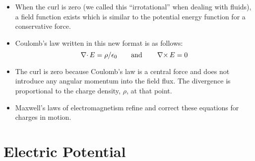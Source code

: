 \documentclass{article}
\begin{document}
\begin{itemize}
\item When the curl is zero (we called this ``irrotational'' when dealing with fluids), a field function exists which is similar to the potential energy function for a conservative force.

\item Coulomb's law written in this new format is as follows:
%
\begin{equation*}
\operatorname{\nabla \cdot}{E} = \rho/\epsilon_0 \qquad \text{and} \qquad \operatorname{\nabla \times}{E} = 0
\end{equation*}
\item The curl is zero because Coulomb's law is a central force and does not introduce any angular momentum into the field flux. The divergence is proportional to the charge density, $\rho$, at that point.

\item Maxwell's laws of electromagnetism refine and correct these equations for charges in motion.

\end{itemize}

\newpage
\section{Electric Potential}

\end{document}
